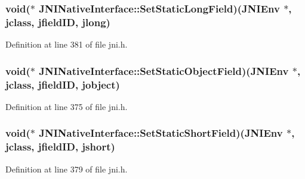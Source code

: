 \hypertarget{struct_j_n_i_native_interface_ac580b29bbae1708d66839529882ac3e3}{
\subsubsection[{Set\-Static\-Long\-Field}]{\setlength{\rightskip}{0pt plus 5cm}void($\ast$ J\-N\-I\-Native\-Interface\-::\-Set\-Static\-Long\-Field)({\bf J\-N\-I\-Env} $\ast$, {\bf jclass}, {\bf jfield\-I\-D}, {\bf jlong})}}\label{struct_j_n_i_native_interface_ac580b29bbae1708d66839529882ac3e3}


Definition at line 381 of file jni.\-h.

\hypertarget{struct_j_n_i_native_interface_a538431304eb14af9d3cc58c389677f86}{
\subsubsection[{Set\-Static\-Object\-Field}]{\setlength{\rightskip}{0pt plus 5cm}void($\ast$ J\-N\-I\-Native\-Interface\-::\-Set\-Static\-Object\-Field)({\bf J\-N\-I\-Env} $\ast$, {\bf jclass}, {\bf jfield\-I\-D}, {\bf jobject})}}\label{struct_j_n_i_native_interface_a538431304eb14af9d3cc58c389677f86}


Definition at line 375 of file jni.\-h.

\hypertarget{struct_j_n_i_native_interface_a1fd4f7756788f5d1093ffec4e5a500f8}{
\subsubsection[{Set\-Static\-Short\-Field}]{\setlength{\rightskip}{0pt plus 5cm}void($\ast$ J\-N\-I\-Native\-Interface\-::\-Set\-Static\-Short\-Field)({\bf J\-N\-I\-Env} $\ast$, {\bf jclass}, {\bf jfield\-I\-D}, {\bf jshort})}}\label{struct_j_n_i_native_interface_a1fd4f7756788f5d1093ffec4e5a500f8}


Definition at line 379 of file jni.\-h.

